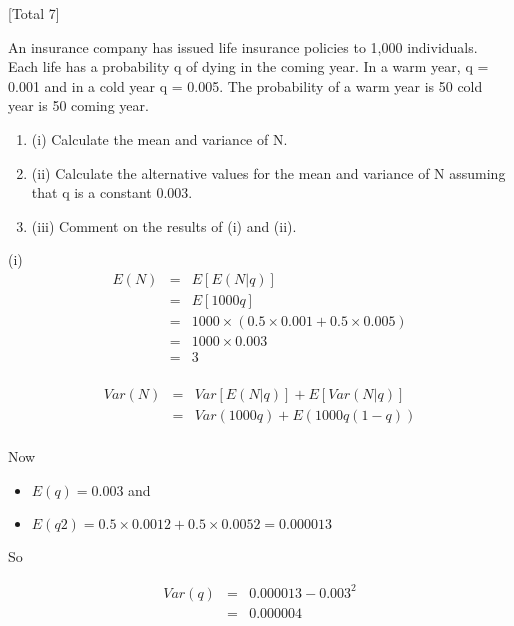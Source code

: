 \documentclass[a4paper,12pt]{article}
\begin{document}
 


[Total 7]

An insurance company has issued life insurance policies to 1,000 individuals. Each
life has a probability q of dying in the coming year. In a warm year, q = 0.001 and in
a cold year q = 0.005. The probability of a warm year is 50%
cold year is 50%
coming year.
\begin{enumerate}
\item (i) Calculate the mean and variance of N.
\item (ii) Calculate the alternative values for the mean and variance of N assuming that
q is a constant 0.003.
\item 
(iii) Comment on the results of (i) and (ii).

\end{enumerate}

(i)
\begin{eqnarray*}
E ( N ) &=& E \left[ E ( N | q ) \right]\\
&=& E \left[ 1000 q \right]\\
&=& 1000 \times ( 0.5 \times 0.001 + 0.5 \times 0.005 )\\
&=& 1000 \times 0.003 \\
&=& 3\\
\end{eqnarray*}

\begin{eqnarray*}
Var ( N ) 
&=& Var \left[ E ( N |q ) \right] + E  \left[ Var ( N| q ) \right]\\
&=& Var (1000 q ) + E (1000 q (1 − q )) \\
\end{eqnarray*}

Now
\begin{itemize}
\item $E ( q ) = 0.003$ and 
\item $E ( q 2 ) = 0.5 \times 0.001 2 + 0.5 \times 0.005 2 = 0.000013$
\end{itemize}

So 

\begin{eqnarray*}
Var ( q ) &=& 0.000013 − 0.003^2 \\
&=& 0.000004\\
\end{eqnarray*}
\end{document}
